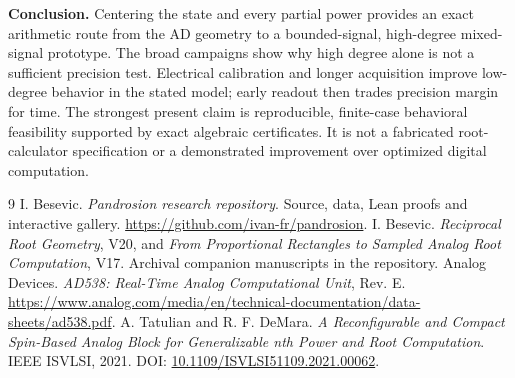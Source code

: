 \documentclass[11pt,a4paper]{article}
\newcommand{\repo}{\url{https://github.com/ivan-fr/pandrosion}}
\begin{document}
\textbf{Conclusion.} Centering the state and every partial power provides an exact arithmetic route from the AD geometry to a bounded-signal, high-degree mixed-signal prototype. The broad campaigns show why high degree alone is not a sufficient precision test. Electrical calibration and longer acquisition improve low-degree behavior in the stated model; early readout then trades precision margin for time. The strongest present claim is reproducible, finite-case behavioral feasibility supported by exact algebraic certificates. It is not a fabricated root-calculator specification or a demonstrated improvement over optimized digital computation.

\begin{thebibliography}{9}\small
{} I. Besevic. \emph{Pandrosion research repository}. Source, data, Lean proofs and interactive gallery. \repo.
 I. Besevic. \emph{Reciprocal Root Geometry}, V20, and \emph{From Proportional Rectangles to Sampled Analog Root Computation}, V17. Archival companion manuscripts in the repository.
 Analog Devices. \emph{AD538: Real-Time Analog Computational Unit}, Rev. E. \url{https://www.analog.com/media/en/technical-documentation/data-sheets/ad538.pdf}.
 A. Tatulian and R. F. DeMara. \emph{A Reconfigurable and Compact Spin-Based Analog Block for Generalizable nth Power and Root Computation}. IEEE ISVLSI, 2021. DOI: \href{https://doi.org/10.1109/ISVLSI51109.2021.00062}{10.1109/ISVLSI51109.2021.00062}.
\end{thebibliography}
\end{document}
